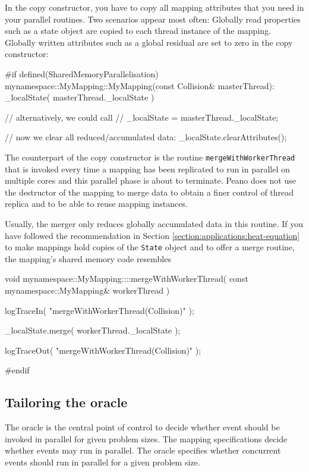 In the copy constructor, you have to copy all mapping attributes that you need
in your parallel routines.
Two scenarios appear most often: Globally read properties such as a state object
are copied to each thread instance of the mapping.
Globally written attributes such as a global residual are set to zero in the
copy constructor:

\begin{code}
#if defined(SharedMemoryParallelisation)
mynamespace::MyMapping::MyMapping(const Collision&  masterThread):
  _localState( masterThread._localState ) {
  // alternatively, we could call
  // _localState = masterThread._localState;
  
  // now we clear all reduced/accumulated data:
  _localState.clearAttributes();
}
\end{code}

\noindent
The counterpart of the copy constructor is the routine
\texttt{mergeWithWorkerThread} that is invoked every time a mapping has been
replicated to run in parallel on multiple cores and this parallel phase is about
to terminate.
Peano does not use the destructor of the mapping to merge data to obtain a finer
control of thread replica and to be able to reuse mapping instances.

Usually, the merger only reduces globally accumulated data in this routine. 
If you have followed the recommendation in Section
\ref{section:applications:heat-equation} to make mappings hold copies of the
\texttt{State} object and to offer a merge routine, the mapping's shared
memory code resembles

\begin{code}
void mynamespace::MyMapping::::mergeWithWorkerThread(
  const mynamespace::MyMapping& workerThread
) {
  logTraceIn( "mergeWithWorkerThread(Collision)" );

  _localState.merge( workerThread._localState );
  
  logTraceOut( "mergeWithWorkerThread(Collision)" );
}
#endif

\end{code}


\subsection{Tailoring the oracle}

The oracle is the central point of control to decide whether event should be
invoked in parallel for given problem sizes.
The mapping specifications decide whether events may run in parallel.
The oracle specifies whether concurrent events should run in parallel for a
given problem size.


